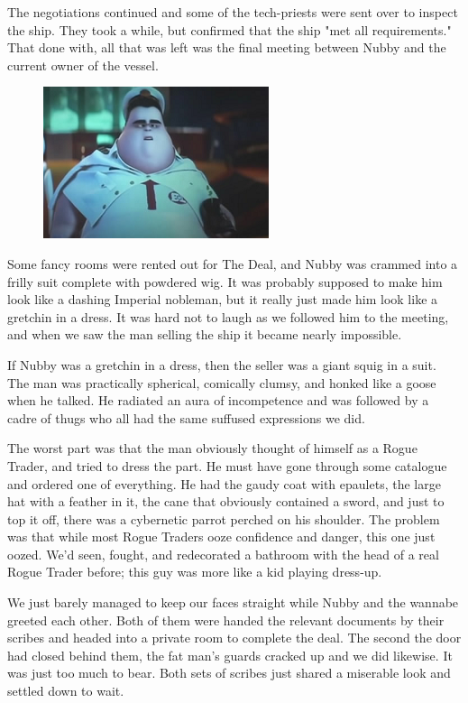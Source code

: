 The negotiations continued and some of the tech-priests were sent over to inspect the ship. 
They took a while, but confirmed that the ship "met all requirements." That done with, all that was left was the final meeting between Nubby and the current owner of the vessel.

\begin{figure}
	\begin{center}
		\includegraphics[width=\figwidth]{pics/7/7.png}
	\end{center}
\end{figure}
Some fancy rooms were rented out for The Deal, and Nubby was crammed into a frilly suit complete with powdered wig. 
It was probably supposed to make him look like a dashing Imperial nobleman, but it really just made him look like a gretchin in a dress. 
It was hard not to laugh as we followed him to the meeting, and when we saw the man selling the ship it became nearly impossible.

If Nubby was a gretchin in a dress, then the seller was a giant squig in a suit. 
 The man was practically spherical, comically clumsy, and honked like a goose when he talked. 
He radiated an aura of incompetence and was followed by a cadre of thugs who all had the same suffused expressions we did.

The worst part was that the man obviously thought of himself as a Rogue Trader, and tried to dress the part. 
He must have gone through some catalogue and ordered one of everything. 
He had the gaudy coat with epaulets, the large hat with a feather in it, the cane that obviously contained a sword, and just to top it off, there was a cybernetic parrot perched on his shoulder. 
The problem was that while most Rogue Traders ooze confidence and danger, this one just oozed. 
We’d seen, fought, and redecorated a bathroom with the head of a real Rogue Trader before; 
this guy was more like a kid playing dress-up.

We just barely managed to keep our faces straight while Nubby and the wannabe greeted each other. 
Both of them were handed the relevant documents by their scribes and headed into a private room to complete the deal. 
The second the door had closed behind them, the fat man’s guards cracked up and we did likewise. 
It was just too much to bear. 
Both sets of scribes just shared a miserable look and settled down to wait.

